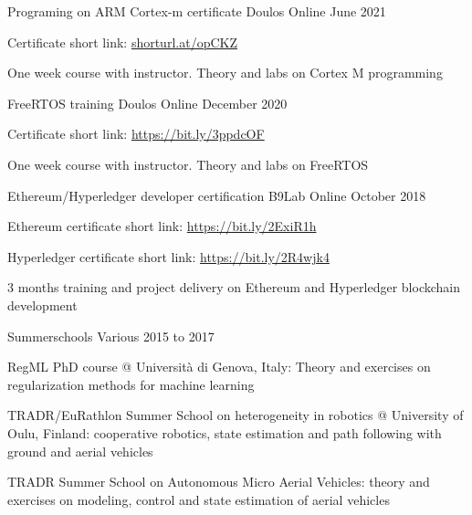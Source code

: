 \cventry
{Programing on ARM Cortex-m certificate} %
{Doulos} %
{Online} %
{June 2021} %
{
  \begin{cvitems} %
    \item{Certificate short link: \url{shorturl.at/opCKZ}}
  \end{cvitems}
  \begin{cvparagraph}
    One week course with instructor. Theory and labs on Cortex M programming
  \end{cvparagraph}
}
\cventry
{FreeRTOS training} %
{Doulos} %
{Online} %
{December 2020} %
{
  \begin{cvitems} %
    \item{Certificate short link: \url{https://bit.ly/3ppdcOF}}
  \end{cvitems}
  \begin{cvparagraph}
    One week course with instructor. Theory and labs on FreeRTOS
  \end{cvparagraph}
}
\cventry
{Ethereum/Hyperledger developer certification} %
{B9Lab} %
{Online} %
{October 2018} %
{
  \begin{cvitems} %
    \item{Ethereum certificate short link: \url{https://bit.ly/2ExiR1h}}
    \item{Hyperledger certificate short link: \url{https://bit.ly/2R4wjk4}}
  \end{cvitems}
  \begin{cvparagraph}
    3 months training and project delivery on Ethereum and Hyperledger blockchain development
  \end{cvparagraph}
}
\cventry
{Summerschools} %
{Various} %
{} %
{2015 to 2017} %
{
  \begin{cvitems} %
    \item{RegML PhD course @ Università di Genova, Italy: Theory and exercises on regularization methods for machine learning}
    \item{TRADR/EuRathlon Summer School on heterogeneity in robotics @ University of Oulu, Finland: cooperative robotics, state estimation and path following with ground and aerial vehicles}
    \item{TRADR Summer School on Autonomous Micro Aerial Vehicles: theory and exercises on modeling, control and state estimation of aerial vehicles}
  \end{cvitems}
}
